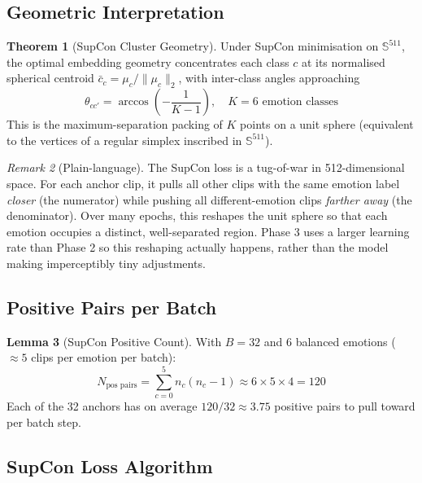 \documentclass[12pt,a4paper]{article}
\theoremstyle{definition}
\newtheorem{theorem}{Theorem}[section]
\newtheorem{lemma}[theorem]{Lemma}
\theoremstyle{remark}
\newtheorem{remark}[theorem]{Remark}
\begin{document}
\subsection{Geometric Interpretation}

\begin{theorem}[SupCon Cluster Geometry]
Under SupCon minimisation on $\mathbb{S}^{511}$, the optimal embedding
geometry concentrates each class $c$ at its normalised spherical centroid
$\bar{c}_c = \mu_c / \|\mu_c\|_2$, with inter-class angles approaching
\[
  \theta_{cc'} = \arccos\!\left(-\frac{1}{K-1}\right),
  \quad K = 6 \text{ emotion classes}
\]
This is the maximum-separation packing of $K$ points on a unit sphere
(equivalent to the vertices of a regular simplex inscribed in $\mathbb{S}^{511}$).
\end{theorem}

\begin{remark}[Plain-language]
The SupCon loss is a tug-of-war in 512-dimensional space.
For each anchor clip, it pulls all other clips with the same emotion
label \emph{closer} (the numerator) while pushing all different-emotion
clips \emph{farther away} (the denominator).
Over many epochs, this reshapes the unit sphere so that each emotion
occupies a distinct, well-separated region.
Phase 3 uses a larger learning rate than Phase 2 so this reshaping
actually happens, rather than the model making imperceptibly tiny
adjustments.
\end{remark}

\subsection{Positive Pairs per Batch}

\begin{lemma}[SupCon Positive Count]
With $B=32$ and 6 balanced emotions ($\approx 5$ clips per emotion per batch):
\[
  N_{\text{pos pairs}} = \sum_{c=0}^{5} n_c(n_c - 1) \approx 6 \times 5 \times 4 = 120
\]
Each of the 32 anchors has on average $120/32 \approx 3.75$ positive pairs
to pull toward per batch step.
\end{lemma}

\subsection{SupCon Loss Algorithm}
\end{document}

